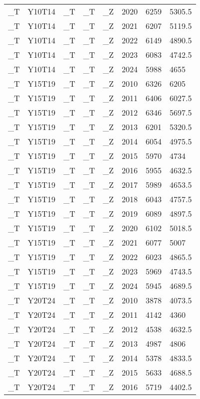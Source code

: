 \begin{longtable}[t]{llllllll}
\addlinespace
\_T & Y10T14 & \_T & \_T & \_Z & 2020 & 6259 & 5305.5\\
\_T & Y10T14 & \_T & \_T & \_Z & 2021 & 6207 & 5119.5\\
\_T & Y10T14 & \_T & \_T & \_Z & 2022 & 6149 & 4890.5\\
\_T & Y10T14 & \_T & \_T & \_Z & 2023 & 6083 & 4742.5\\
\_T & Y10T14 & \_T & \_T & \_Z & 2024 & 5988 & 4655\\
\addlinespace
\_T & Y15T19 & \_T & \_T & \_Z & 2010 & 6326 & 6205\\
\_T & Y15T19 & \_T & \_T & \_Z & 2011 & 6406 & 6027.5\\
\_T & Y15T19 & \_T & \_T & \_Z & 2012 & 6346 & 5697.5\\
\_T & Y15T19 & \_T & \_T & \_Z & 2013 & 6201 & 5320.5\\
\_T & Y15T19 & \_T & \_T & \_Z & 2014 & 6054 & 4975.5\\
\addlinespace
\_T & Y15T19 & \_T & \_T & \_Z & 2015 & 5970 & 4734\\
\_T & Y15T19 & \_T & \_T & \_Z & 2016 & 5955 & 4632.5\\
\_T & Y15T19 & \_T & \_T & \_Z & 2017 & 5989 & 4653.5\\
\_T & Y15T19 & \_T & \_T & \_Z & 2018 & 6043 & 4757.5\\
\_T & Y15T19 & \_T & \_T & \_Z & 2019 & 6089 & 4897.5\\
\addlinespace
\_T & Y15T19 & \_T & \_T & \_Z & 2020 & 6102 & 5018.5\\
\_T & Y15T19 & \_T & \_T & \_Z & 2021 & 6077 & 5007\\
\_T & Y15T19 & \_T & \_T & \_Z & 2022 & 6023 & 4865.5\\
\_T & Y15T19 & \_T & \_T & \_Z & 2023 & 5969 & 4743.5\\
\_T & Y15T19 & \_T & \_T & \_Z & 2024 & 5945 & 4689.5\\
\addlinespace
\_T & Y20T24 & \_T & \_T & \_Z & 2010 & 3878 & 4073.5\\
\_T & Y20T24 & \_T & \_T & \_Z & 2011 & 4142 & 4360\\
\_T & Y20T24 & \_T & \_T & \_Z & 2012 & 4538 & 4632.5\\
\_T & Y20T24 & \_T & \_T & \_Z & 2013 & 4987 & 4806\\
\_T & Y20T24 & \_T & \_T & \_Z & 2014 & 5378 & 4833.5\\
\addlinespace
\_T & Y20T24 & \_T & \_T & \_Z & 2015 & 5633 & 4688.5\\
\_T & Y20T24 & \_T & \_T & \_Z & 2016 & 5719 & 4402.5\\

\end{longtable}
